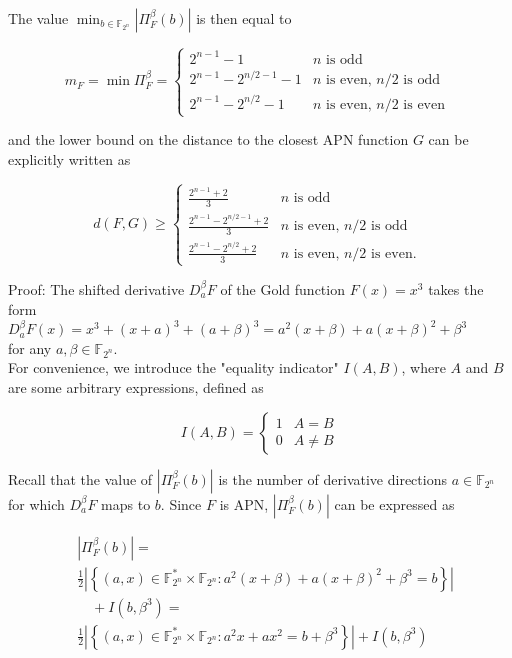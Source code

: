 \documentclass[10pt]{article}
\begin{document}
The value $\min _{b \in \mathbb{F}_{2^{n}}}\left|\Pi_{F}^{\beta}(b)\right|$ is then equal to

\[
m_{F}=\min \Pi_{F}^{\beta}= \begin{cases}2^{n-1}-1 & n \text { is odd }  \tag{10}\\ 2^{n-1}-2^{n / 2-1}-1 & n \text { is even, } n / 2 \text { is odd } \\ 2^{n-1}-2^{n / 2}-1 & n \text { is even, } n / 2 \text { is even }\end{cases}
\]

and the lower bound on the distance to the closest APN function $G$ can be explicitly written as

\[
d(F, G) \geq \begin{cases}\frac{2^{n-1}+2}{3} & n \text { is odd }  \tag{11}\\ \frac{2^{n-1}-2^{n / 2-1}+2}{3} & n \text { is even, } n / 2 \text { is odd } \\ \frac{2^{n-1}-2^{n / 2}+2}{3} & n \text { is even, } n / 2 \text { is even. }\end{cases}
\]

Proof: The shifted derivative $D_{a}^{\beta} F$ of the Gold function $F(x)=x^{3}$ takes the form\\
$D_{a}^{\beta} F(x)=x^{3}+(x+a)^{3}+(a+\beta)^{3}=a^{2}(x+\beta)+a(x+\beta)^{2}+\beta^{3}$\\
for any $a, \beta \in \mathbb{F}_{2^{n}}$.\\
For convenience, we introduce the "equality indicator" $I(A, B)$, where $A$ and $B$ are some arbitrary expressions, defined as

$$
I(A, B)= \begin{cases}1 & A=B \\ 0 & A \neq B\end{cases}
$$

Recall that the value of $\left|\Pi_{F}^{\beta}(b)\right|$ is the number of derivative directions $a \in \mathbb{F}_{2^{n}}$ for which $D_{a}^{\beta} F$ maps to $b$. Since $F$ is APN, $\left|\Pi_{F}^{\beta}(b)\right|$ can be expressed as


\begin{align*}
& \left|\Pi_{F}^{\beta}(b)\right|= \\
& \frac{1}{2}\left|\left\{(a, x) \in \mathbb{F}_{2^{n}}^{*} \times \mathbb{F}_{2^{n}}: a^{2}(x+\beta)+a(x+\beta)^{2}+\beta^{3}=b\right\}\right| \\
& \quad+I\left(b, \beta^{3}\right)= \\
& \frac{1}{2}\left|\left\{(a, x) \in \mathbb{F}_{2^{n}}^{*} \times \mathbb{F}_{2^{n}}: a^{2} x+a x^{2}=b+\beta^{3}\right\}\right|+I\left(b, \beta^{3}\right) \tag{12}
\end{align*}
\end{document}
